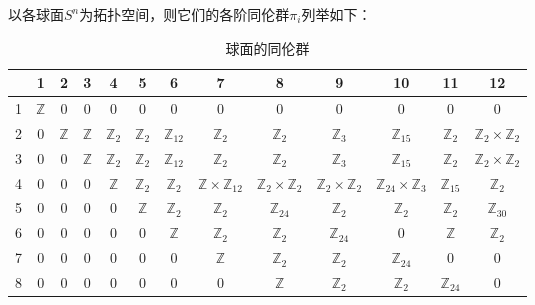 

以各球面$S^n$为拓扑空间，则它们的各阶同伦群$\pi_i$列举如下：

\begin{table}[ht]
\centering
\caption{球面的同伦群}\label{SphHmt_tab1}
\begin{tabular}{|c|c|c|c|c|c|c|c|c|c|c|c|c|}
\hline
 & 1 & 2 & 3 & 4 & 5 & 6 & 7 & 8 & 9 & 10 & 11 & 12 \\
\hline
1 & $\mathbb{Z}$ & 0 & 0 & 0 & 0 & 0 & 0 & 0 & 0 & 0 & 0 & 0 \\
\hline
2 & 0 & $\mathbb{Z}$ & $\mathbb{Z}$ & $\mathbb{Z}_2$ & $\mathbb{Z}_2$ & $\mathbb{Z}_{12}$ & $\mathbb{Z}_2$ & $\mathbb{Z}_2$ & $\mathbb{Z}_3$ & $\mathbb{Z}_{15}$ & $\mathbb{Z}_2$ & $\mathbb{Z}_2\times\mathbb{Z}_2$\\
\hline
3 & 0 & 0 & $\mathbb{Z}$ & $\mathbb{Z}_2$ & $\mathbb{Z}_2$ & $\mathbb{Z}_{12}$ & $\mathbb{Z}_2$ & $\mathbb{Z}_2$ & $\mathbb{Z}_3$ & $\mathbb{Z}_{15}$ & $\mathbb{Z}_2$ & $\mathbb{Z}_2\times\mathbb{Z}_2$ \\
\hline
4 & 0 & 0 & 0 & $\mathbb{Z}$ & $\mathbb{Z}_2$ & $\mathbb{Z}_2$ & $\mathbb{Z}\times\mathbb{Z}_{12}$ & $\mathbb{Z}_2\times\mathbb{Z}_2$ & $\mathbb{Z}_2\times\mathbb{Z}_2$ & $\mathbb{Z}_{24}\times\mathbb{Z}_3$ & $\mathbb{Z}_{15}$ & $\mathbb{Z}_2$ \\
\hline
5 & 0 & 0 & 0 & 0 & $\mathbb{Z}$ & $\mathbb{Z}_2$ & $\mathbb{Z}_2$ & $\mathbb{Z}_{24}$ & $\mathbb{Z}_2$ & $\mathbb{Z}_2$ & $\mathbb{Z}_2$ & $\mathbb{Z}_{30}$ \\
\hline
6 & 0 & 0 & 0 & 0 & 0 & $\mathbb{Z}$ & $\mathbb{Z}_2$ & $\mathbb{Z}_2$ & $\mathbb{Z}_{24}$ & 0 & $\mathbb{Z}$ & $\mathbb{Z}_2$ \\
\hline
7 & 0 & 0 & 0 & 0 & 0 & 0 & $\mathbb{Z}$ & $\mathbb{Z}_2$ & $\mathbb{Z}_2$ & $\mathbb{Z}_{24}$ & 0 & 0 \\
\hline
8 & 0 & 0 & 0 & 0 & 0 & 0 & 0 & $\mathbb{Z}$ & $\mathbb{Z}_2$ & $\mathbb{Z}_2$ & $\mathbb{Z}_{24}$ & 0 \\
\hline
\end{tabular}
\end{table}